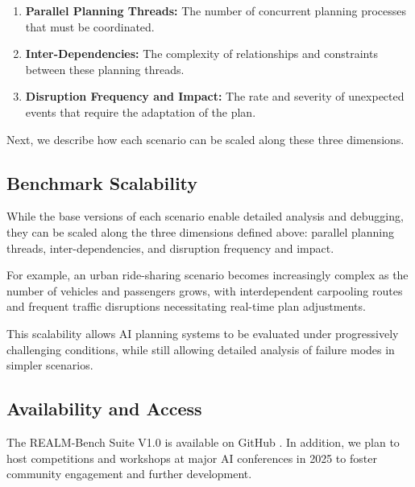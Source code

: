 \begin{enumerate}[leftmargin=1em, topsep=0em, parsep=0em, label=\arabic*.]
\item \textbf{Parallel Planning Threads:} The number of concurrent planning processes that must be coordinated. 
\item \textbf{Inter-Dependencies:} The complexity of relationships and constraints between these planning threads. 
\item \textbf{Disruption Frequency and Impact:} The rate and severity of unexpected events that require the adaptation of the plan. 
\end{enumerate}

Next, we describe how each scenario can be scaled along these three dimensions.

\subsection{Benchmark Scalability}

While the base versions of each scenario enable detailed analysis and debugging, they can be scaled along the three dimensions defined above: parallel planning threads, inter-dependencies, and disruption frequency and impact. 

For example, an urban ride-sharing scenario becomes increasingly complex as the number of vehicles and passengers grows, with interdependent carpooling routes and frequent traffic disruptions necessitating real-time plan adjustments.

This scalability allows AI planning systems to be evaluated under progressively challenging conditions, while still allowing detailed analysis of failure modes in simpler scenarios.

\subsection{Availability and Access}

The REALM-Bench Suite V1.0 is available on GitHub \cite{REALM-Bench-Github}. In addition, we plan to host competitions and workshops at major AI conferences in 2025 to foster community engagement and further development.
